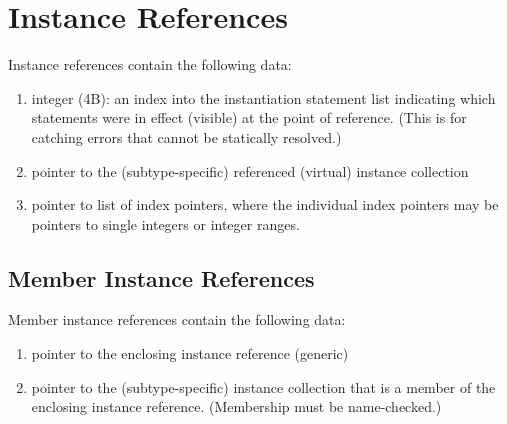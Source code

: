 \section{Instance References}
\label{sec:instance:reference}

Instance references contain the following data:

\begin{enumerate}
\item integer (4B): an index into the instantiation statement list
	indicating which statements were in effect (visible) at the
	point of reference.  (This is for catching errors that cannot
	be statically resolved.)
\item pointer to the (subtype-specific) referenced (virtual) instance collection
\item pointer to list of index pointers, 
	where the individual index pointers may be 
	pointers to single integers or integer ranges.  
\end{enumerate}

\subsection{Member Instance References}
\label{sec:instance:reference:member}

Member instance references contain the following data:

\begin{enumerate}
\item pointer to the enclosing instance reference (generic)
\item pointer to the (subtype-specific) instance collection 
	that is a member of the enclosing instance reference.  
	(Membership must be name-checked.)
\end{enumerate}


